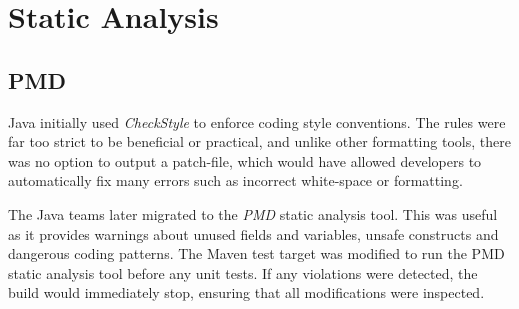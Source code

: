 \section{Static Analysis}
\subsection{PMD}
\par
Java initially used \textit{CheckStyle}\cite{CheckStyle} to enforce coding style conventions. The rules were far too strict to be beneficial or practical, and unlike other formatting tools, there was no option to output a patch-file, which would have allowed developers to automatically fix many errors such as incorrect white-space or formatting.

\par
The Java teams later migrated to the \textit{PMD}\cite{PMD} static analysis tool. This was useful as it provides warnings about unused fields and variables, unsafe constructs and dangerous coding patterns. The Maven test target was modified to run the PMD static analysis tool before any unit tests. If any violations were detected, the build would immediately stop, ensuring that all modifications were inspected.
